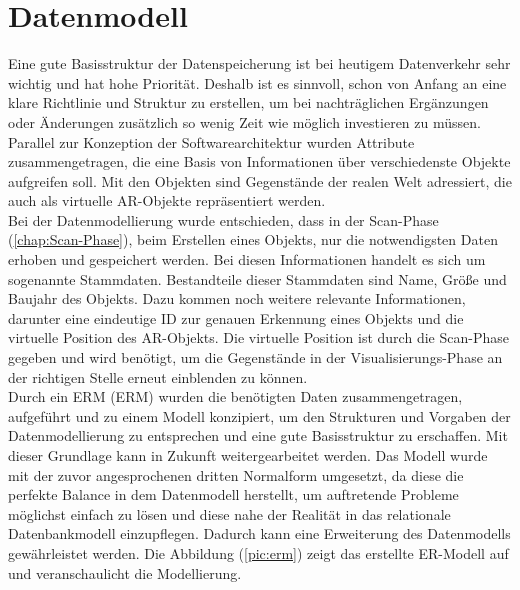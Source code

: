 \section{Datenmodell}
\label{chap:Datenmodell}
Eine gute Basisstruktur der Datenspeicherung ist bei heutigem Datenverkehr sehr wichtig und hat hohe Priorität. Deshalb ist 
es sinnvoll, schon von Anfang an eine klare Richtlinie und Struktur zu erstellen, um bei nachträglichen Ergänzungen oder Änderungen zusätzlich so wenig 
Zeit wie möglich investieren zu müssen. Parallel zur Konzeption der Softwarearchitektur wurden Attribute zusammengetragen, die 
eine Basis von Informationen über verschiedenste Objekte aufgreifen soll. Mit den Objekten sind Gegenstände der realen Welt adressiert, die auch als 
virtuelle \acs{AR}-Objekte repräsentiert werden. 
\\
Bei der Datenmodellierung wurde entschieden, dass in der Scan-Phase (\ref{chap:Scan-Phase}), beim Erstellen eines Objekts, nur die notwendigsten 
Daten erhoben und gespeichert werden. Bei diesen Informationen handelt es sich um sogenannte Stammdaten. Bestandteile dieser Stammdaten sind Name, 
Größe und Baujahr des Objekts. Dazu kommen noch weitere relevante Informationen, darunter eine eindeutige ID zur genauen Erkennung eines Objekts und 
die virtuelle Position des \acs{AR}-Objekts. Die virtuelle Position ist durch die Scan-Phase gegeben und wird benötigt, um die Gegenstände in der 
Visualisierungs-Phase an der richtigen Stelle erneut einblenden zu können. 
\\ 
\linebreak 
Durch ein \acl{ERM} (\acs{ERM}) wurden die benötigten Daten zusammengetragen, aufgeführt und zu einem Modell konzipiert, um den Strukturen und 
Vorgaben der Datenmodellierung zu entsprechen und eine gute Basisstruktur zu erschaffen. Mit dieser Grundlage kann in Zukunft weitergearbeitet werden. 
Das Modell wurde mit der zuvor angesprochenen dritten Normalform umgesetzt, da diese die perfekte Balance in dem Datenmodell herstellt, um auftretende 
Probleme möglichst einfach zu lösen und diese nahe der Realität in das relationale Datenbankmodell einzupflegen. Dadurch kann eine Erweiterung des 
Datenmodells gewährleistet werden. Die Abbildung (\ref{pic:erm}) zeigt das erstellte ER-Modell auf und veranschaulicht die Modellierung. 
\\ 
